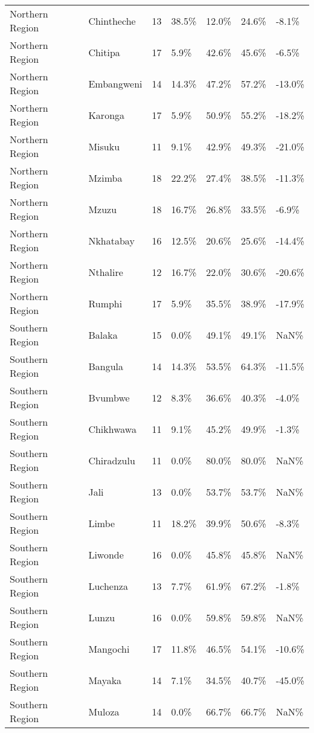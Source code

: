 \begin{table}[ht]
\begin{tabular}{llrllll}
  Northern Region & Chintheche &  13 & 38.5\% & 12.0\% & 24.6\% & -8.1\% \\ 
  Northern Region & Chitipa &  17 & 5.9\% & 42.6\% & 45.6\% & -6.5\% \\ 
  Northern Region & Embangweni &  14 & 14.3\% & 47.2\% & 57.2\% & -13.0\% \\ 
  Northern Region & Karonga &  17 & 5.9\% & 50.9\% & 55.2\% & -18.2\% \\ 
  Northern Region & Misuku &  11 & 9.1\% & 42.9\% & 49.3\% & -21.0\% \\ 
  Northern Region & Mzimba &  18 & 22.2\% & 27.4\% & 38.5\% & -11.3\% \\ 
  Northern Region & Mzuzu &  18 & 16.7\% & 26.8\% & 33.5\% & -6.9\% \\ 
  Northern Region & Nkhatabay &  16 & 12.5\% & 20.6\% & 25.6\% & -14.4\% \\ 
  Northern Region & Nthalire &  12 & 16.7\% & 22.0\% & 30.6\% & -20.6\% \\ 
  Northern Region & Rumphi &  17 & 5.9\% & 35.5\% & 38.9\% & -17.9\% \\ 
  Southern Region & Balaka &  15 & 0.0\% & 49.1\% & 49.1\% & NaN\% \\ 
  Southern Region & Bangula &  14 & 14.3\% & 53.5\% & 64.3\% & -11.5\% \\ 
  Southern Region & Bvumbwe &  12 & 8.3\% & 36.6\% & 40.3\% & -4.0\% \\ 
  Southern Region & Chikhwawa &  11 & 9.1\% & 45.2\% & 49.9\% & -1.3\% \\ 
  Southern Region & Chiradzulu &  11 & 0.0\% & 80.0\% & 80.0\% & NaN\% \\ 
  Southern Region & Jali &  13 & 0.0\% & 53.7\% & 53.7\% & NaN\% \\ 
  Southern Region & Limbe &  11 & 18.2\% & 39.9\% & 50.6\% & -8.3\% \\ 
  Southern Region & Liwonde &  16 & 0.0\% & 45.8\% & 45.8\% & NaN\% \\ 
  Southern Region & Luchenza &  13 & 7.7\% & 61.9\% & 67.2\% & -1.8\% \\ 
  Southern Region & Lunzu &  16 & 0.0\% & 59.8\% & 59.8\% & NaN\% \\ 
  Southern Region & Mangochi &  17 & 11.8\% & 46.5\% & 54.1\% & -10.6\% \\ 
  Southern Region & Mayaka &  14 & 7.1\% & 34.5\% & 40.7\% & -45.0\% \\ 
  Southern Region & Muloza &  14 & 0.0\% & 66.7\% & 66.7\% & NaN\% \\ 

\end{tabular}
\end{table}
